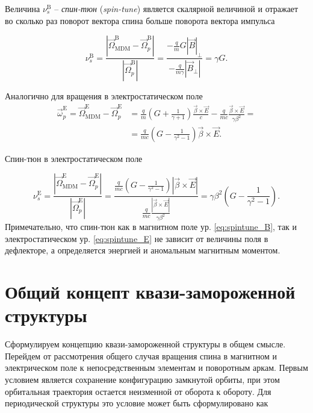 \noindent Величина $\nu_s^{\textrm{B}}$ -- \textit{спин-тюн} (\textit{spin-tune}) является скалярной величиной и отражает во сколько раз поворот вектора спина больше поворота вектора импульса

\begin{equation} 
\nu_s^{\textrm{B}}=\frac{\left|{\vec{\Omega}}_{\textrm{MDM}}^{\textrm{B}}-{\vec{\Omega}}_p^{\textrm{B}}\right|}{\left|{\vec{\Omega}}_p^{\textrm{B}}\right|}=\frac{-\frac{q}{m}{G\left|\vec{B}\right|}_\bot}{-\frac{q}{m\gamma}\left|{\vec{B}}_\bot\right|}=\gamma G.
\label{eq:spintune_B}
\end{equation}

\noindent Аналогично для вращения в электростатическом поле
\begin{equation}
\begin{aligned}
{\vec{\omega}}_p^{\textrm{E}}={\vec{\Omega}}_{\textrm{MDM}}^{\textrm{E}}-{\vec{\Omega}}_p^{\textrm{E}}&=\frac{q}{m}\left(G+\frac{1}{\gamma+1}\right)\frac{\vec{\beta}\times\vec{E}}{c}-\frac{q}{mc}\frac{\vec{\beta}\times\vec{E}}{\gamma\beta^2} =\\
&=\frac{q}{mc}\left(G-\frac{1}{\gamma^2-1}\right)\vec{\beta}\times\vec{E}.
\end{aligned}
\end{equation}

\noindent Спин-тюн в электростатическом поле

\begin{equation} 
\nu_s^{\textrm{E}}=\frac{\left|{\vec{\Omega}}_{\textrm{MDM}}^{\textrm{E}}-{\vec{\Omega}}_p^{\textrm{E}}\right|}{\left|{\vec{\Omega}}_p^{\textrm{E}}\right|}=\frac{\frac{q}{mc}\left(G-\frac{1}{\gamma^2-1}\right)\left|\vec{\beta}\times\vec{E}\right|}{\frac{q}{mc}\frac{\left|\vec{\beta}\times\vec{E}\right|}{\gamma\beta^2}}=\gamma\beta^2\left(G-\frac{1}{\gamma^2-1}\right).
\label{eq:spintune_E}
\end{equation}
Примечательно, что спин-тюн как в магнитном поле ур. \ref{eq:spintune_B}, так и  электростатическом ур. \ref{eq:spintune_E} не зависит от величины поля в дефлекторе, а определяется энергией и аномальным магнитным моментом.

\section{Общий концепт квази-замороженной структуры}\label{sec:EDM/requirements/deflector}

\par Сформулируем концепцию квази-замороженной структуры в общем смысле. Перейдем от рассмотрения общего случая вращения спина в магнитном и электрическом поле к непосредственным элементам и поворотным аркам. Первым условием является сохранение конфигурацию замкнутой орбиты, при этом орбитальная траектория остается неизменной от оборота к обороту. Для периодической структуры это условие может быть сформулировано как 

